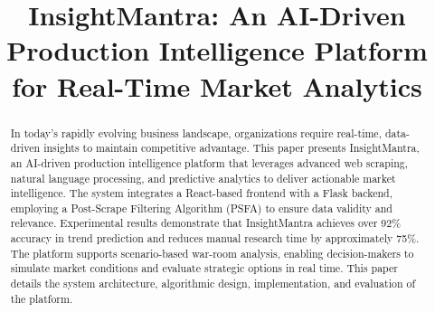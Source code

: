 \documentclass[conference]{IEEEtran}
\begin{document}
\title{InsightMantra: An AI-Driven Production Intelligence Platform for Real-Time Market Analytics}

\author{
\and
{}
\and
{}
}

\maketitle

\begin{abstract}
In today's rapidly evolving business landscape, organizations require real-time, data-driven insights to maintain competitive advantage. This paper presents InsightMantra, an AI-driven production intelligence platform that leverages advanced web scraping, natural language processing, and predictive analytics to deliver actionable market intelligence. The system integrates a React-based frontend with a Flask backend, employing a Post-Scrape Filtering Algorithm (PSFA) to ensure data validity and relevance. Experimental results demonstrate that InsightMantra achieves over 92\% accuracy in trend prediction and reduces manual research time by approximately 75\%. The platform supports scenario-based war-room analysis, enabling decision-makers to simulate market conditions and evaluate strategic options in real time. This paper details the system architecture, algorithmic design, implementation, and evaluation of the platform.
\end{abstract}
\end{document}
